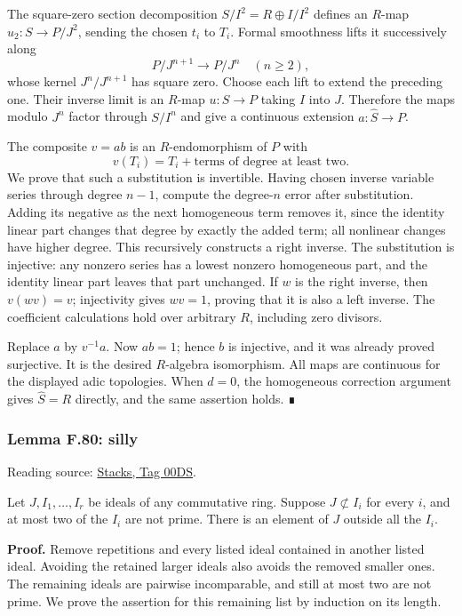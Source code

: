 \documentclass[11pt,a4paper,openany]{report}
\begin{document}
The square-zero section decomposition \(S/I^2=R\oplus I/I^2\) defines an \(R\)-map \(u_2:S\to P/J^2\), sending the chosen \(t_i\) to \(T_i\). Formal smoothness lifts it successively along \[P/J^{n+1}\longrightarrow P/J^n\quad(n\geq2),\] whose kernel \(J^n/J^{n+1}\) has square zero. Choose each lift to extend the preceding one. Their inverse limit is an \(R\)-map \(u:S\to P\) taking \(I\) into \(J\). Therefore the maps modulo \(J^n\) factor through \(S/I^n\) and give a continuous extension \(a:\widehat S\to P\).

The composite \(v=ab\) is an \(R\)-endomorphism of \(P\) with \[v(T_i)=T_i+\text{terms of degree at least two}.\] We prove that such a substitution is invertible. Having chosen inverse variable series through degree \(n-1\), compute the degree-\(n\) error after substitution. Adding its negative as the next homogeneous term removes it, since the identity linear part changes that degree by exactly the added term; all nonlinear changes have higher degree. This recursively constructs a right inverse. The substitution is injective: any nonzero series has a lowest nonzero homogeneous part, and the identity linear part leaves that part unchanged. If \(w\) is the right inverse, then \(v(wv)=v\); injectivity gives \(wv=1\), proving that it is also a left inverse. The coefficient calculations hold over arbitrary \(R\), including zero divisors.

Replace \(a\) by \(v^{-1}a\). Now \(ab=1\); hence \(b\) is injective, and it was already proved surjective. It is the desired \(R\)-algebra isomorphism. All maps are continuous for the displayed adic topologies. When \(d=0\), the homogeneous correction argument gives \(\widehat S=R\) directly, and the same assertion holds. ∎

\label{AG-RG-S05-algebra-lemma-silly}

\subsubsection{Lemma F.80: silly}\label{AG-RG-S05-lemma-f.80-silly}

Reading source: \href{https://stacks.math.columbia.edu/tag/00DS}{Stacks, Tag 00DS}.

Let \(J,I_1,\ldots,I_r\) be ideals of any commutative ring. Suppose \(J\not\subset I_i\) for every \(i\), and at most two of the \(I_i\) are not prime. There is an element of \(J\) outside all the \(I_i\).

\textbf{Proof.} Remove repetitions and every listed ideal contained in another listed ideal. Avoiding the retained larger ideals also avoids the removed smaller ones. The remaining ideals are pairwise incomparable, and still at most two are not prime. We prove the assertion for this remaining list by induction on its length.
\end{document}
